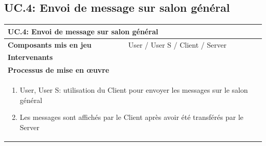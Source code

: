 \documentclass[a4paper,11pt,french]{article}
\begin{document}
\subsection{UC.4: Envoi de message sur salon général}
\begin{center}
	\vspace*{0.7cm}
	\begin{tabularx}{16cm}{|l|X|}
	\hline
	\multicolumn{2}{|l|}{\textbf{UC.4: Envoi de message sur salon général}}\\
	\hline
	\textbf{Composants mis en jeu} & User / User S / Client / Server \\
	\hline
	\textbf{Intervenants} & \\
	\hline
	\multicolumn{2}{|l|}{\textbf{Processus de mise en \oe uvre}}\\
	\hline
	\multicolumn{2}{|p{15cm}|}{\begin{enumerate}\item User, User S: utilisation du Client pour envoyer les messages sur le salon général \item Les messages sont affichés par le Client après avoir été transférés par le Server\end{enumerate}}\\
	\hline
	\end{tabularx}
\end{center}
\vspace{2cm}
\end{document}
